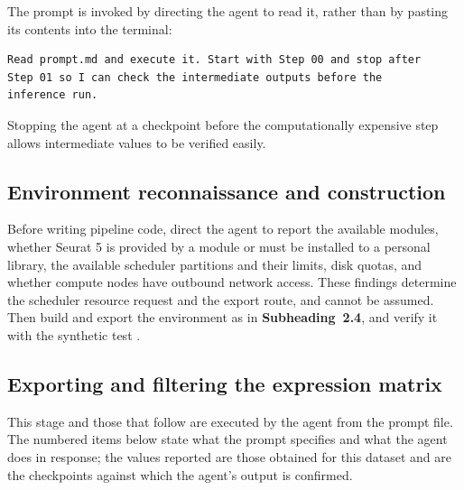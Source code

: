The prompt is invoked by directing the agent to read it, rather than by pasting its contents into the terminal:

\begin{lstlisting}
Read prompt.md and execute it. Start with Step 00 and stop after
Step 01 so I can check the intermediate outputs before the
inference run.
\end{lstlisting}

Stopping the agent at a checkpoint before the computationally expensive step allows intermediate values to be verified easily.

\subsection{Environment reconnaissance and construction}

Before writing pipeline code, direct the agent to report the available modules, whether Seurat 5 is provided by a module or must be installed to a personal library, the available scheduler partitions and their limits, disk quotas, and whether compute nodes have outbound network access. These findings determine the scheduler resource request and the export route, and cannot be assumed. Then build and export the environment as in \textbf{Subheading~2.4}, and verify it with the synthetic test .

\subsection{Exporting and filtering the expression matrix}

This stage and those that follow are executed by the agent from the prompt file. The numbered items below state what the prompt specifies and what the agent does in response; the values reported are those obtained for this dataset and are the checkpoints against which the agent's output is confirmed.

